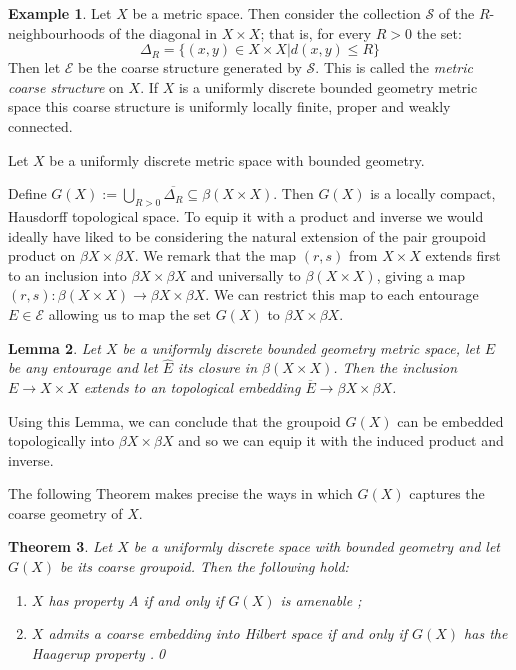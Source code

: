 \documentclass[preprint]{elsarticle}
\theoremstyle{plain}
\newtheorem{theorem}{Theorem}%
\newtheorem{lemma}[theorem]{Lemma}%
\theoremstyle{definition}%
\newtheorem{example}[theorem]{Example}%
\theoremstyle{remark}%
\begin{document}
\begin{example}\label{ex:MCS}
Let $X$ be a metric space. Then consider the collection $\mathcal{S}$ of the $R$-neighbourhoods of the diagonal in $X\times X$; that is, for every $R>0$ the set:
\begin{equation*}
\Delta_{R}=\lbrace (x,y) \in X \times X | d(x,y)\leq R \rbrace
\end{equation*}
Then let $\mathcal{E}$ be the coarse structure generated by $\mathcal{S}$. This is called the \textit{metric coarse structure} on $X$. If  $X$ is a uniformly discrete bounded geometry  metric space this coarse structure is uniformly locally finite, proper and weakly connected.
\end{example}

Let $X$ be a uniformly discrete metric space with bounded geometry. 

Define $G(X):=\bigcup_{R>0}\overline{\Delta_{R}} \subseteq \beta(X\times X)$. Then $G(X)$ is a locally compact, Hausdorff topological space. To equip it with a product and inverse we would ideally have liked to be considering the natural extension of the pair groupoid product on $\beta X \times \beta X$.  We remark that the map $(r,s)$ from $X \times X$ extends first to an inclusion into $\beta X \times \beta X$ and universally to $\beta( X \times X)$, giving a map $(r,s): \beta (X\times X) \rightarrow \beta X \times \beta X$. We can restrict this map to each entourage $E \in \mathcal{E}$ allowing us to map the set $G(X)$ to $\beta X \times \beta X$. 

\begin{lemma}\label{Lem:CorRoe}\cite[Corollary 10.18]{MR2007488}
Let $X$ be a uniformly discrete bounded geometry metric space, let $E$ be any entourage and let $\widehat{E}$ its closure in $\beta(X \times X)$. Then the inclusion $E \rightarrow X \times X$ extends to an topological embedding $\overline{E} \rightarrow \beta X \times \beta X$.
\end{lemma}

Using this Lemma, we can conclude that the groupoid $G(X)$ can be embedded topologically into $\beta X \times \beta X$ and so we can equip it with the induced product and inverse.

The following Theorem makes precise the ways in which $G(X)$ captures the coarse geometry of $X$.

\begin{theorem}\label{thm:coarseprop}
Let $X$ be a uniformly discrete space with bounded geometry and let $G(X)$ be its coarse groupoid. Then the following hold:
\begin{enumerate}
\item $X$ has property A if and only if $G(X)$ is amenable \cite[Theorem 5.3]{MR1905840};
\item $X$ admits a coarse embedding into Hilbert space if and only if $G(X)$ has the Haagerup property \cite[Theorem 5.4]{MR1905840}.\qed
\end{enumerate}
\end{theorem}
\end{document}
